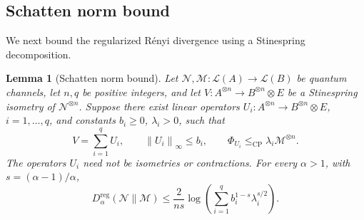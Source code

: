\documentclass[11pt,letterpaper]{article}
\numberwithin{equation}{section}
\newtheorem{lemma}[theorem]{Lemma}
\newcommand{\N}{\mathcal N}
\newcommand{\M}{\mathcal M}
\newcommand{\reg}{\mathrm{reg}}
\newcommand{\cp}{\mathrm{CP}}
\newcommand{\Dt}{D}
\newcommand{\cL}{\mathcal L}
\newcommand{\norm}[1]{\left\lVert#1\right\rVert}
\begin{document}
\subsection{Schatten norm bound}\label{sec:decomposition}
We next bound the regularized R\'enyi divergence using a Stinespring decomposition.

\begin{lemma}[Schatten norm bound]\label{lem:decomposition}
Let $\N,\M:\cL(A)\to\cL(B)$ be quantum channels, let $n,q$ be positive integers, and let $V:A^{\otimes n}\to B^{\otimes n}\otimes E$ be a Stinespring isometry of $\N^{\otimes n}$. Suppose there exist linear operators $U_i:A^{\otimes n}\to B^{\otimes n}\otimes E$, $i=1,\ldots,q$, and constants $b_i\ge0$, $\lambda_i>0$, such that
\[
 V=\sum_{i=1}^q U_i,\qquad
 \norm{U_i}_\infty\le b_i,\qquad
 \Phi_{U_i}\le_{\cp}\lambda_i\M^{\otimes n}.
\]
The operators $U_i$ need not be isometries or contractions. For every $\alpha>1$, with $s=(\alpha-1)/\alpha$,
\begin{equation}\label{eq:decomposition}
 \Dt_\alpha^{\reg}(\N\|\M)
 \le\frac{2}{ns}\log\left(\sum_{i=1}^q
               b_i^{1-s}\lambda_i^{s/2}\right).
\end{equation}
\end{lemma}
\end{document}
